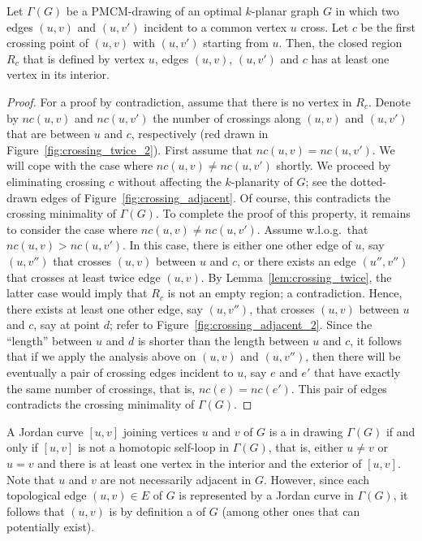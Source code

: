 \begin{lemma}
Let $\Gamma(G)$ be a PMCM-drawing of an optimal $k$-planar graph $G$ in which two edges $(u,v)$ and $(u,v')$ incident to a common vertex $u$ cross. Let $c$ be the first crossing point of $(u,v)$ with $(u,v')$ starting from $u$. Then, the closed region $R_{c}$ that is defined by vertex $u$, edges $(u,v)$, $(u,v')$ and $c$ has at least one vertex in its interior.
\label{lem:crossing_adjacent}
\end{lemma}
\begin{proof}
For a proof by contradiction, assume that there is no vertex in $R_{c}$. Denote by $nc(u,v)$ and $nc(u,v')$ the number of crossings along $(u,v)$ and $(u,v')$ that are between $u$ and $c$, respectively (red drawn in Figure~\ref{fig:crossing_twice_2}). First assume that $nc(u,v) = nc(u,v')$. We will cope with the case where $nc(u,v) \neq nc(u,v')$ shortly. We proceed by eliminating crossing $c$ without affecting the $k$-planarity of $G$; see the dotted-drawn edges of Figure~\ref{fig:crossing_adjacent}. Of course, this contradicts the crossing minimality of $\Gamma(G)$. To complete the proof of this property, it remains to consider the case where $nc(u,v) \neq nc(u,v')$. Assume w.l.o.g.~that $nc(u,v) > nc(u,v')$. In this case, there is either one other edge of $u$, say $(u,v'')$ that crosses $(u,v)$ between $u$ and $c$, or there exists an edge $(u'',v'')$ that crosses at least twice edge $(u,v)$. By Lemma~\ref{lem:crossing_twice}, the latter case would imply that $R_{c}$ is not an empty region; a contradiction. Hence, there exists at least one other edge, say $(u,v'')$, that crosses $(u,v)$ between $u$ and $c$, say at point $d$; refer to Figure~\ref{fig:crossing_adjacent_2}. Since the ``length'' between $u$ and $d$ is shorter than the length between $u$ and $c$, it follows that if we apply the analysis above on $(u,v)$ and $(u,v'')$, then there will be eventually a pair of crossing edges incident to $u$, say $e$ and $e'$ that have exactly the same number of crossings, that is, $nc(e) = nc(e')$. This pair of edges contradicts the crossing minimality of $\Gamma(G)$.   
\end{proof}

A Jordan curve $[u,v]$ joining vertices $u$ and $v$ of $G$ is a \emph{\pe} in drawing $\Gamma(G)$ if and only if $[u,v]$ is not a homotopic self-loop in $\Gamma(G)$, that is, either $u \neq v$ or $u=v$ and there is at least one vertex in the interior and the exterior of $[u,v]$. Note that $u$ and $v$ are not necessarily adjacent in $G$. However, since each topological edge $(u,v) \in E$ of $G$ is represented by a Jordan curve in $\Gamma(G)$, it follows that $(u,v)$ is by definition a \pe of $G$ (among other ones that can potentially exist).

